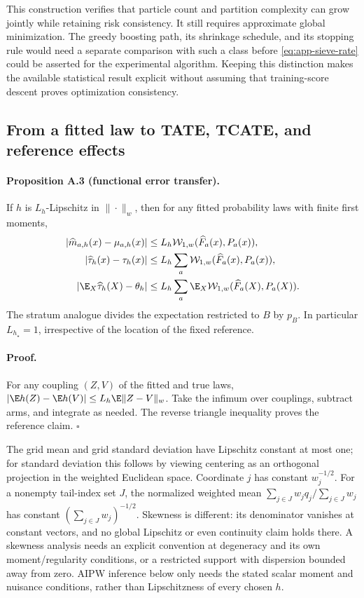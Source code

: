 This construction verifies that particle count and partition complexity can grow jointly while retaining risk consistency. It still requires approximate global minimization. The greedy boosting path, its shrinkage schedule, and its stopping rule would need a separate comparison with such a class before \eqref{eq:app-sieve-rate} could be asserted for the experimental algorithm. Keeping this distinction makes the available statistical result explicit without assuming that training-score descent proves optimization consistency.

\subsection{From a fitted law to TATE, TCATE, and reference effects}

\paragraph{Proposition A.3 (functional error transfer).}
If $h$ is $L_h$-Lipschitz in $\|\cdot\|_w$, then for any fitted probability laws with finite first moments,
\begin{align}
 |\widehat m_{a,h}(x)-\mu_{a,h}(x)|&\leq L_h\mathcal W_{1,w}(\widehat F_a(x),P_a(x)),\nonumber\\
 |\widehat\tau_h(x)-\tau_h(x)|&\leq L_h\sum_a\mathcal W_{1,w}(\widehat F_a(x),P_a(x)),\label{eq:app-transfer}\\
 |\E_X\widehat\tau_h(X)-\theta_h|&\leq L_h\sum_a\E_X\mathcal W_{1,w}(\widehat F_a(X),P_a(X)).\nonumber
\end{align}
The stratum analogue divides the expectation restricted to $B$ by $p_B$. In particular $L_{h_\star}=1$, irrespective of the location of the fixed reference.

\paragraph{Proof.}
For any coupling $(Z,V)$ of the fitted and true laws, $|\E h(Z)-\E h(V)|\leq L_h\E\|Z-V\|_w$. Take the infimum over couplings, subtract arms, and integrate as needed. The reverse triangle inequality proves the reference claim. $\square$

The grid mean and grid standard deviation have Lipschitz constant at most one; for standard deviation this follows by viewing centering as an orthogonal projection in the weighted Euclidean space. Coordinate $j$ has constant $w_j^{-1/2}$. For a nonempty tail-index set $J$, the normalized weighted mean $\sum_{j\in J}w_jq_j/\sum_{j\in J}w_j$ has constant $(\sum_{j\in J}w_j)^{-1/2}$. Skewness is different: its denominator vanishes at constant vectors, and no global Lipschitz or even continuity claim holds there. A skewness analysis needs an explicit convention at degeneracy and its own moment/regularity conditions, or a restricted support with dispersion bounded away from zero. AIPW inference below only needs the stated scalar moment and nuisance conditions, rather than Lipschitzness of every chosen $h$.

